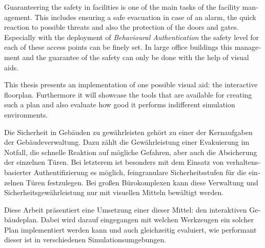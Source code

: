 
\null\vfil
\begin{otherlanguage}{english}
\begin{center}\textsf{\textbf{\abstractname}}\end{center}

\noindent Guaranteering the safety in facilities is one of the main tasks of the facility management. This includes ensuring a safe evacuation in case of an alarm, the quick reaction to possible threats and also the protection of the doors and gates. Especially with the deployment of \emph{Behavioural Authentication} the safety level for each of these access points can be finely set. In large office buildings this management and the guarantee of the safety can only be done with the help of visual aids.

This thesis presents an implementation of one possible visual aid: the interactive floorplan. Furthermore it will showcase the tools that are available for creating such a plan and also evaluate how good it performs indifferent simulation environments.

\end{otherlanguage}
\vfil\null



\null\vfil
\begin{otherlanguage}{ngerman}
\begin{center}\textsf{\textbf{\abstractname}}\end{center}

\noindent Die Sicherheit in Gebäuden zu gewährleisten gehört zu einer der Kernaufgaben der Gebäudeverwaltung. Dazu zählt die Gewährleistung einer Evakuierung im Notfall, die schnelle Reaktion auf mögliche Gefahren, aber auch die Absicherung der einzelnen Türen. Bei letzterem ist besonders mit dem Einsatz von verhaltensbasierter Authentifizierung es möglich, feingranulare Sicherheitsstufen für die einzelnen Türen festzulegen. Bei großen Bürokomplexen kann diese Verwaltung und Sicherheitsgewährleistung nur mit visuellen Mitteln bewältigt werden. 

Diese Arbeit präsentiert eine Umsetzung einer dieser Mittel: den interaktiven Gebäudeplan. Dabei wird darauf eingegangen mit welchen Werkzeugen ein solcher Plan implementiert werden kann und auch gleichzeitig evaluiert, wie performant dieser ist in  verschiedenen Simulationsumgebungen.

\end{otherlanguage}
\vfil\null



